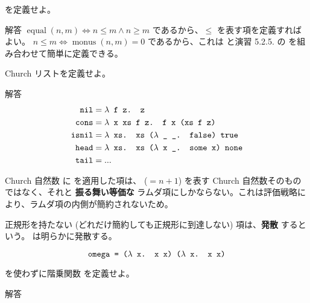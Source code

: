 \begin{jexercise*}[5.2.7]
   を定義せよ。
\end{jexercise*}
\begin{itembox}[l]{解答}
  $\operatorname{equal}(n, m) \iff n \leq m \land n \geq m$ であるから、$\leq$ を表す項を定義すればよい。
  $n \leq m \iff \operatorname{monus}(n, m) = 0$ であるから、これは  と演習 5.2.5. の  を組み合わせて簡単に定義できる。
\end{itembox}

\begin{jexercise*}[5.2.8]
  Church リストを定義せよ。
\end{jexercise*}
\begin{itembox}[l]{解答}
  \begin{align*}
    \text{\texttt{nil}}
      & = \text{\texttt{$\lambda$ f z. z}}
    \\ \text{\texttt{cons}}
      & = \text{\texttt{$\lambda$ x xs f z. f x (xs f z)}}
    \\ \text{\texttt{isnil}}
      & = \text{\texttt{$\lambda$ xs. xs ($\lambda$ \_ \_. false) true}}
    \\ \text{\texttt{head}}
      & = \text{\texttt{$\lambda$ xs. xs ($\lambda$ x \_. some x) none}}
    \\ \text{\texttt{tail}}
      & = ...
  \end{align*}
\end{itembox}

Church 自然数  に  を適用した項は、 ($= n + 1$) を表す Church 自然数そのものではなく、それと {\bf 振る舞い等価な} ラムダ項にしかならない。これは評価戦略により、ラムダ項の内側が簡約されないため。

正規形を持たない (どれだけ簡約しても正規形に到達しない) 項は、{\bf 発散} するという。 は明らかに発散する。

\[
  \text{\texttt{omega = ($\lambda$ x. x x) ($\lambda$ x. x x)}}
\]

\begin{jexercise*}[5.2.9]
   を使わずに階乗関数  を定義せよ。
\end{jexercise*}
\begin{itembox}[l]{解答}
\end{itembox}
